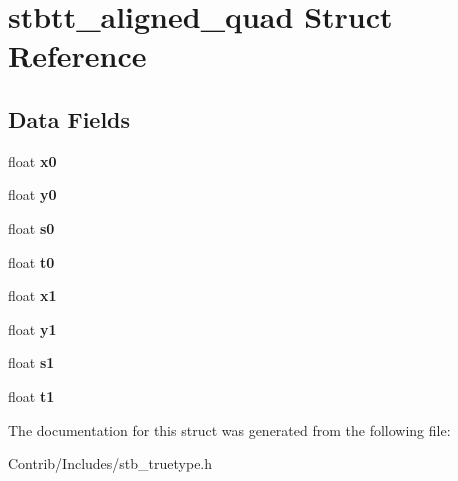 \hypertarget{structstbtt__aligned__quad}{}\section{stbtt\+\_\+aligned\+\_\+quad Struct Reference}
\label{structstbtt__aligned__quad}
\subsection*{Data Fields}
\begin{DoxyCompactItemize}
\item 
float {\bfseries x0}\hypertarget{structstbtt__aligned__quad_a3c9556645d92e863376a4063a3ad7001}{}\label{structstbtt__aligned__quad_a3c9556645d92e863376a4063a3ad7001}

\item 
float {\bfseries y0}\hypertarget{structstbtt__aligned__quad_adf19b8ba42d497d3093c3a51b1a32cca}{}\label{structstbtt__aligned__quad_adf19b8ba42d497d3093c3a51b1a32cca}

\item 
float {\bfseries s0}\hypertarget{structstbtt__aligned__quad_a27b218612ed19775b8ec3407da74db71}{}\label{structstbtt__aligned__quad_a27b218612ed19775b8ec3407da74db71}

\item 
float {\bfseries t0}\hypertarget{structstbtt__aligned__quad_a618b1245721cc083957a0e13a409af25}{}\label{structstbtt__aligned__quad_a618b1245721cc083957a0e13a409af25}

\item 
float {\bfseries x1}\hypertarget{structstbtt__aligned__quad_a3389d8b95846602e8f94cc15f41e48e9}{}\label{structstbtt__aligned__quad_a3389d8b95846602e8f94cc15f41e48e9}

\item 
float {\bfseries y1}\hypertarget{structstbtt__aligned__quad_a9fe80bf4738047a31d7c162807ed85f0}{}\label{structstbtt__aligned__quad_a9fe80bf4738047a31d7c162807ed85f0}

\item 
float {\bfseries s1}\hypertarget{structstbtt__aligned__quad_a2b10e3ff8ddc612278a30549f2ee0255}{}\label{structstbtt__aligned__quad_a2b10e3ff8ddc612278a30549f2ee0255}

\item 
float {\bfseries t1}\hypertarget{structstbtt__aligned__quad_ab003a1a52083f94ec0e39bb78b8295b0}{}\label{structstbtt__aligned__quad_ab003a1a52083f94ec0e39bb78b8295b0}

\end{DoxyCompactItemize}


The documentation for this struct was generated from the following file\+:\begin{DoxyCompactItemize}
\item 
Contrib/\+Includes/stb\+\_\+truetype.\+h\end{DoxyCompactItemize}
